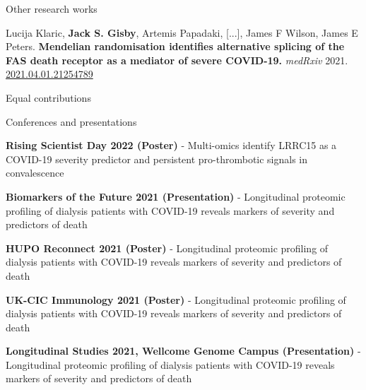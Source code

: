 \documentclass{resume}
\begin{document}
\begin{rSection}{Other research works}

\vspace{1pt plus 1pt}

\item Lucija Klaric\textsuperscript{\textdagger}, \textbf{Jack S. Gisby}\textsuperscript{\textdagger}, Artemis Papadaki\textsuperscript{\textdagger}, [...], James F Wilson\textsuperscript{\textdagger}, James E Peters\textsuperscript{\textdagger}. \textbf{Mendelian randomisation identifies alternative splicing of the FAS death receptor as a mediator of severe COVID-19.} \textit{medRxiv} 2021. \href{https://doi.org/10.1101/2021.04.01.21254789 }{2021.04.01.21254789}

\textdagger Equal contributions \hfill {}

\end{rSection}
\begin{rSection}{Conferences and presentations}

\item \textbf{Rising Scientist Day 2022 (Poster)} - Multi-omics identify LRRC15 as a COVID-19 severity predictor and persistent pro-thrombotic signals in convalescence
\vspace{3pt plus 1pt minus 1pt}

\item \textbf{Biomarkers of the Future 2021 (Presentation)} - Longitudinal proteomic profiling of dialysis patients with COVID-19 reveals markers of severity and predictors of death
\vspace{3pt plus 1pt minus 1pt}

\item \textbf{HUPO Reconnect 2021 (Poster)} - Longitudinal proteomic profiling of dialysis patients with COVID-19 reveals markers of severity and predictors of death
\vspace{3pt plus 1pt minus 1pt}

\item \textbf{UK-CIC Immunology 2021 (Poster)} - Longitudinal proteomic profiling of dialysis patients with COVID-19 reveals markers of severity and predictors of death
\vspace{3pt plus 1pt minus 1pt}

\item \textbf{Longitudinal Studies 2021, Wellcome Genome Campus (Presentation)} - Longitudinal proteomic profiling of dialysis patients with COVID-19 reveals markers of severity and predictors of death

\end{rSection}
\end{document}
